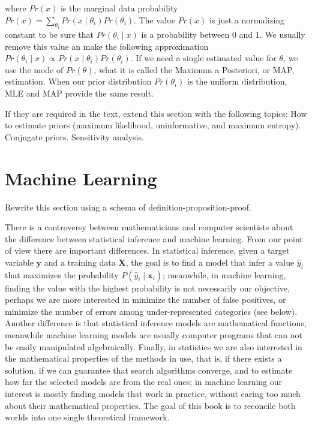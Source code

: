 where $Pr\left(x\right)$ is the marginal data probability $Pr\left( x \right) = \sum_{\theta_i} Pr\left( x \mid \theta_i \right) Pr\left( \theta_i \right)$. The value $Pr\left(x\right)$ is just a normalizing constant to be sure that $Pr\left(\theta_i \mid x\right)$ is a probability between $0$ and $1$. We usually remove this value an make the following approximation $Pr\left(\theta_i \mid x\right) \propto Pr\left(x\mid\theta_i\right) Pr\left(\theta_i \right)$. If we need a single estimated value for $\theta$, we use the mode of $Pr(\theta)$, what it is called the Maximum a Posteriori, or MAP, estimation. When our prior distribution $Pr\left(\theta_i \right)$ is the uniform distribution, MLE and MAP provide the same result.

    {\color{red} If they are required in the text, extend this section with the following topics: How to estimate priors (maximum likelihood, uninformative, and maximum entropy). Conjugate priors. Sensitivity analysis.}

%
%

\section{Machine Learning}
\label{sec:machine_learning}

{\color{red} Rewrite this section using a schema of definition-proposition-proof.}

There is a controversy between mathematicians and computer scientists about the difference between statistical inference and machine learning. From our point of view there are important differences. In statistical inference, given a target variable $\mathbf{y}$ and a training data $\mathbf{X}$, the goal is to find a model that infer a value $\hat{y}_i$ that maximizes the probability $P(\hat{y}_i \mid \mathbf{x}_i)$; meanwhile, in machine learning, finding the value with the highest probability is not necessarily our objective, perhaps we are more interested in minimize the number of false positives, or minimize the number of errors among under-represented categories (see below). Another difference is that statistical inference models are mathematical functions, meanwhile machine learning models are usually computer programs that can not be easily manipulated algebraically. Finally, in statistics we are also interested in the mathematical properties of the methods in use, that is, if there exists a solution, if we can guarantee that search algorithms converge, and to estimate how far the selected models are from the real ones; in machine learning our interest is mostly finding models that work in practice, without caring too much about their mathematical properties. The goal of this book is to reconcile both worlds into one single theoretical framework.

